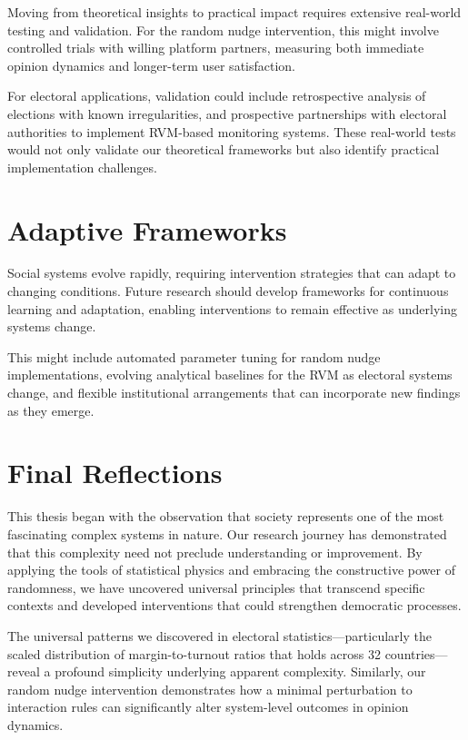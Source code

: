 Moving from theoretical insights to practical impact requires extensive real-world testing and validation. For the random nudge intervention, this might involve controlled trials with willing platform partners, measuring both immediate opinion dynamics and longer-term user satisfaction.

For electoral applications, validation could include retrospective analysis of elections with known irregularities, and prospective partnerships with electoral authorities to implement RVM-based monitoring systems. These real-world tests would not only validate our theoretical frameworks but also identify practical implementation challenges.

\section{Adaptive Frameworks}

Social systems evolve rapidly, requiring intervention strategies that can adapt to changing conditions. Future research should develop frameworks for continuous learning and adaptation, enabling interventions to remain effective as underlying systems change.

This might include automated parameter tuning for random nudge implementations, evolving analytical baselines for the RVM as electoral systems change, and flexible institutional arrangements that can incorporate new findings as they emerge.

\section{Final Reflections}

This thesis began with the observation that society represents one of the most fascinating complex systems in nature. Our research journey has demonstrated that this complexity need not preclude understanding or improvement. By applying the tools of statistical physics and embracing the constructive power of randomness, we have uncovered universal principles that transcend specific contexts and developed interventions that could strengthen democratic processes.

The universal patterns we discovered in electoral statistics—particularly the scaled distribution of margin-to-turnout ratios that holds across 32 countries—reveal a profound simplicity underlying apparent complexity. Similarly, our random nudge intervention demonstrates how a minimal perturbation to interaction rules can significantly alter system-level outcomes in opinion dynamics.

